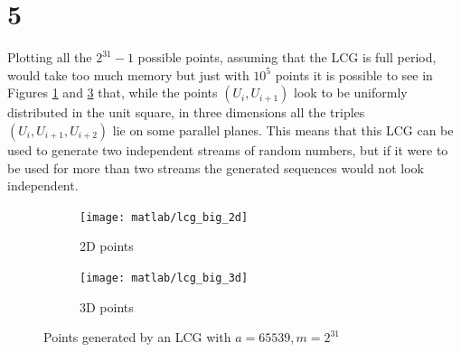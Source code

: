 \documentclass[a4paper,oneside]{article}
\begin{document}
\section*{5}
Plotting all the $2^{31} -1$ possible points, assuming that the LCG is
full period, would take too much memory but just with $10^5$ points it
is possible to see in Figures \ref{plot:lcg_big_2d} and
\ref{plot:lcg_big_3d} that, while the points $(U_i, U_{i+1})$ look to
be uniformly distributed in the unit square, in three dimensions all
the triples $(U_i, U_{i+1}, U_{i+2})$ lie on some parallel
planes. This means that this LCG can be used to generate two
independent streams of random numbers, but if it were to be used for
more than two streams the generated sequences would not look
independent.
\begin{figure}[htbp]
  \centering
  \begin{subfigure}{0.5\textwidth}
    \centering
    \texttt{[image: matlab/lcg\_big\_2d]}
    \caption{2D points}
    \label{plot:lcg_big_2d}
  \end{subfigure}%
  \begin{subfigure}{0.5\textwidth}
    \centering
    \texttt{[image: matlab/lcg\_big\_3d]}
    \caption{3D points}
    \label{plot:lcg_big_3d}
  \end{subfigure}
  \caption{Points generated by an LCG with $a = 65539, m = 2^{31}$}
\end{figure}
\end{document}
